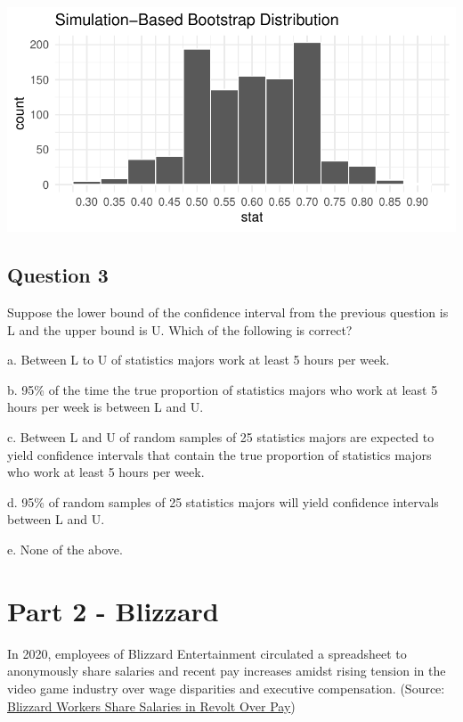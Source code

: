\documentclass[
  letterpaper,
  DIV=11,
  numbers=noendperiod]{scrartcl}
\begin{document}
\includegraphics{exam-2-review_files/figure-pdf/unnamed-chunk-2-1.pdf}

\subsection{Question 3}\label{question-3}

Suppose the lower bound of the confidence interval from the previous
question is L and the upper bound is U. Which of the following is
correct?

a. Between L to U of statistics majors work at least 5 hours per week.

b. 95\% of the time the true proportion of statistics majors who work at
least 5 hours per week is between L and U.

c. Between L and U of random samples of 25 statistics majors are
expected to yield confidence intervals that contain the true proportion
of statistics majors who work at least 5 hours per week.

d. 95\% of random samples of 25 statistics majors will yield confidence
intervals between L and U.

e. None of the above.

\newpage{}

\section{Part 2 - Blizzard}\label{part-2---blizzard}

In 2020, employees of Blizzard Entertainment circulated a spreadsheet to
anonymously share salaries and recent pay increases amidst rising
tension in the video game industry over wage disparities and executive
compensation. (Source:
\href{https://www.bloomberg.com/news/articles/2020-08-03/blizzard-workers-share-salaries-in-revolt-over-wage-disparities}{Blizzard
Workers Share Salaries in Revolt Over Pay})
\end{document}
